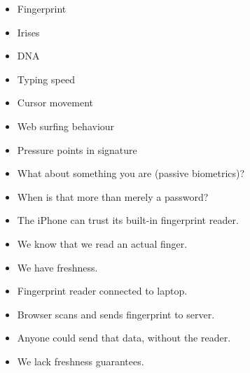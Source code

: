 \begin{frame}
  \begin{example}
    \begin{itemize}
      \item Fingerprint
      \item Irises
      \item DNA
    \end{itemize}
  \end{example}

  \pause{}

  \begin{example}
    \begin{itemize}
      \item Typing speed
      \item Cursor movement
      \item Web surfing behaviour
      \item Pressure points in signature
    \end{itemize}
  \end{example}
\end{frame}

\begin{frame}
  \begin{exercise}
    \begin{itemize}
      \item What about something you are (passive biometrics)?
      \item When is that more than merely a password?
    \end{itemize}
  \end{exercise}
\end{frame}

\begin{frame}
  \begin{example}
    \begin{itemize}
      \item The iPhone can trust its built-in fingerprint reader.
      \item We know that we read an actual finger.
      \item We have freshness.
    \end{itemize}
  \end{example}

  \pause{}

  \begin{example}
    \begin{itemize}
      \item Fingerprint reader connected to laptop.
      \item Browser scans and sends fingerprint to server.
      \item Anyone could send that data, without the reader.
      \item We lack freshness guarantees.
    \end{itemize}
  \end{example}
\end{frame}

